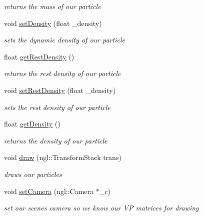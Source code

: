 \begin{DoxyCompactItemize}
\begin{DoxyCompactList}\small\item\em returns the mass of our particle \end{DoxyCompactList}\item 
void \hyperlink{classparticle_ab31fe756e1178e92cd4ee758635195ce}{set\-Density} (float \-\_\-density)
\begin{DoxyCompactList}\small\item\em sets the dynamic density of our particle \end{DoxyCompactList}\item 
\hypertarget{classparticle_a2cf7e7f0fbc93851a8c73cf824528968}{float \hyperlink{classparticle_a2cf7e7f0fbc93851a8c73cf824528968}{get\-Rest\-Density} ()}\label{classparticle_a2cf7e7f0fbc93851a8c73cf824528968}

\begin{DoxyCompactList}\small\item\em returns the rest density of our particle \end{DoxyCompactList}\item 
void \hyperlink{classparticle_a87171c315e8fe569d833a5bf26e22213}{set\-Rest\-Density} (float \-\_\-density)
\begin{DoxyCompactList}\small\item\em sets the rest density of our particle \end{DoxyCompactList}\item 
\hypertarget{classparticle_a48283e5e0e3fa83e19f7cfd286a863b1}{float \hyperlink{classparticle_a48283e5e0e3fa83e19f7cfd286a863b1}{get\-Density} ()}\label{classparticle_a48283e5e0e3fa83e19f7cfd286a863b1}

\begin{DoxyCompactList}\small\item\em returns the density of our particle \end{DoxyCompactList}\item 
void \hyperlink{classparticle_a6193659820dd29890c3319da28346658}{draw} (ngl\-::\-Transform\-Stack trans)
\begin{DoxyCompactList}\small\item\em draws our particles \end{DoxyCompactList}\item 
void \hyperlink{classparticle_a795f103cded87c05bf417f0b96adbbfd}{set\-Camera} (ngl\-::\-Camera $\ast$\-\_\-c)
\begin{DoxyCompactList}\small\item\em set our scenes camera so we know our V\-P matrices for drawing \end{DoxyCompactList}\end{DoxyCompactItemize}


